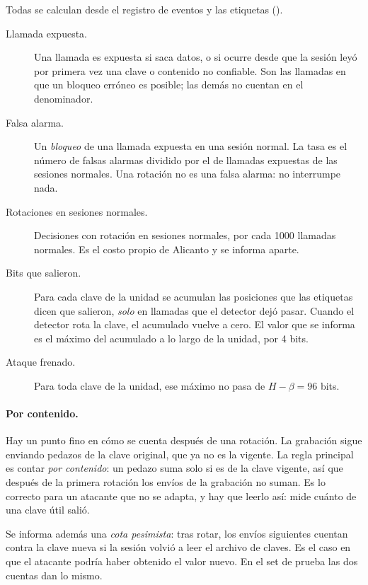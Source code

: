 Todas se calculan desde el registro de eventos y las etiquetas ().

\begin{description}
  \item[Llamada expuesta.] Una llamada es expuesta si saca datos, o si ocurre desde que la sesión leyó
    por primera vez una clave o contenido no confiable. Son las llamadas en que un bloqueo erróneo es
    posible; las demás no cuentan en el denominador.
  \item[Falsa alarma.] Un \emph{bloqueo} de una llamada expuesta en una sesión normal. La tasa es el
    número de falsas alarmas dividido por el de llamadas expuestas de las sesiones normales. Una
    rotación no es una falsa alarma: no interrumpe nada.
  \item[Rotaciones en sesiones normales.] Decisiones con rotación en sesiones normales, por cada
    \num{1000} llamadas normales. Es el costo propio de Alicanto y se informa aparte.
  \item[Bits que salieron.] Para cada clave de la unidad se acumulan las posiciones que las etiquetas
    dicen que salieron, \emph{solo} en llamadas que el detector dejó pasar. Cuando el detector rota la
    clave, el acumulado vuelve a cero. El valor que se informa es el máximo del acumulado a lo largo de
    la unidad, por 4 bits.
  \item[Ataque frenado.] Para toda clave de la unidad, ese máximo no pasa de $H - \beta = 96$ bits.
\end{description}

\paragraph{Por contenido.} Hay un punto fino en cómo se cuenta después de una rotación. La grabación
sigue enviando pedazos de la clave original, que ya no es la vigente. La regla principal es contar
\emph{por contenido}: un pedazo suma solo si es de la clave vigente, así que después de la primera
rotación los envíos de la grabación no suman. Es lo correcto para un atacante que no se adapta, y hay
que leerlo así: mide cuánto de una clave útil salió.

Se informa además una \emph{cota pesimista}: tras rotar, los envíos siguientes cuentan contra la clave
nueva si la sesión volvió a leer el archivo de claves. Es el caso en que el atacante podría haber
obtenido el valor nuevo. En el set de prueba las dos cuentas dan lo mismo.


